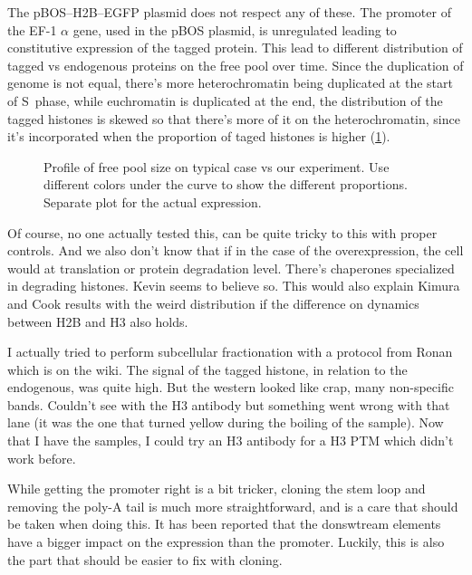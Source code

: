   The pBOS--H2B--EGFP plasmid does not respect any of these. The promoter of the EF-1 $\alpha$ gene, used in the
  pBOS plasmid, is unregulated leading to constitutive expression of the tagged protein. This lead to different
  distribution of tagged vs endogenous proteins on the free pool over time. Since the duplication
  of genome is not equal, there's more heterochromatin being duplicated at the start of S~phase, while
  euchromatin is duplicated at the end, the distribution of the tagged histones is skewed so that there's
  more of it on the heterochromatin, since it's incorporated when the proportion of taged histones is
  higher (\ref{fig:mess-histone-expression}).
  
  \begin{figure}
    \centering
                 {Profile of free pool size on typical case vs our experiment. Use
                  different colors under the curve to show the different proportions.
                  Separate plot for the actual expression}.
    \label{fig:mess-histone-expression}
  \end{figure}
  
  Of course, no one actually tested this, can be quite tricky to this with proper controls. And we also
  don't know that if in the case of the overexpression, the cell would at translation or protein degradation
  level. There's chaperones specialized in degrading histones. Kevin seems to believe so. This would
  also explain Kimura and Cook results with the weird distribution if the difference on dynamics
  between H2B and H3 also holds.
  
  I actually tried to perform subcellular fractionation with a protocol from Ronan which is on the wiki.
  The signal of the tagged histone, in relation to the endogenous, was quite high. But the western
  looked like crap, many non-specific bands. Couldn't see with the H3 antibody but something went
  wrong with that lane (it was the one that turned yellow during the boiling of the sample). Now that
  I have the samples, I could try an H3 antibody for a H3 PTM which didn't work before.
  
  While getting the promoter right is a bit tricker, cloning the stem loop and removing the poly-A tail
  is much more straightforward, and is a care that should be taken when doing this. It has been reported
  that the donswtream elements have a bigger impact on the expression than the promoter. Luckily, this
  is also the part that should be easier to fix with cloning.
  
